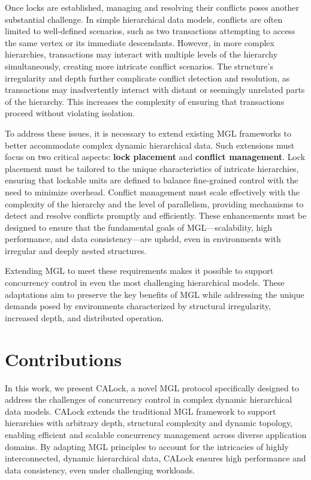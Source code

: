 Once locks are established, managing and resolving their conflicts poses another substantial challenge. In simple hierarchical data models, conflicts are often limited to well-defined scenarios, such as two transactions attempting to access the same vertex or its immediate descendants. However, in more complex hierarchies, transactions may interact with multiple levels of the hierarchy simultaneously, creating more intricate conflict scenarios. The structure's irregularity and depth further complicate conflict detection and resolution, as transactions may inadvertently interact with distant or seemingly unrelated parts of the hierarchy. This increases the complexity of ensuring that transactions proceed without violating isolation.


To address these issues, it is necessary to extend existing MGL frameworks to better accommodate complex dynamic hierarchical data. Such extensions must focus on two critical aspects: \textbf{lock placement} and \textbf{conflict management}. Lock placement must be tailored to the unique characteristics of intricate hierarchies, ensuring that lockable units are defined to balance fine-grained control with the need to minimize overhead. Conflict management must scale effectively with the complexity of the hierarchy and the level of parallelism, providing mechanisms to detect and resolve conflicts promptly and efficiently. These enhancements must be designed to ensure that the fundamental goals of MGL—scalability, high performance, and data consistency—are upheld, even in environments with irregular and deeply nested structures.

Extending MGL to meet these requirements makes it possible to support concurrency control in even the most challenging hierarchical models. These adaptations aim to preserve the key benefits of MGL while addressing the unique demands posed by environments characterized by structural irregularity, increased depth, and distributed operation.



\section*{Contributions}

In this work, we present CALock, a novel MGL protocol specifically designed to address the challenges of concurrency control in complex dynamic hierarchical data models. CALock extends the traditional MGL framework to support hierarchies with arbitrary depth, structural complexity and dynamic topology, enabling efficient and scalable concurrency management across diverse application domains. By adapting MGL principles to account for the intricacies of highly interconnected, dynamic hierarchical data, CALock ensures high performance and data consistency, even under challenging workloads.

